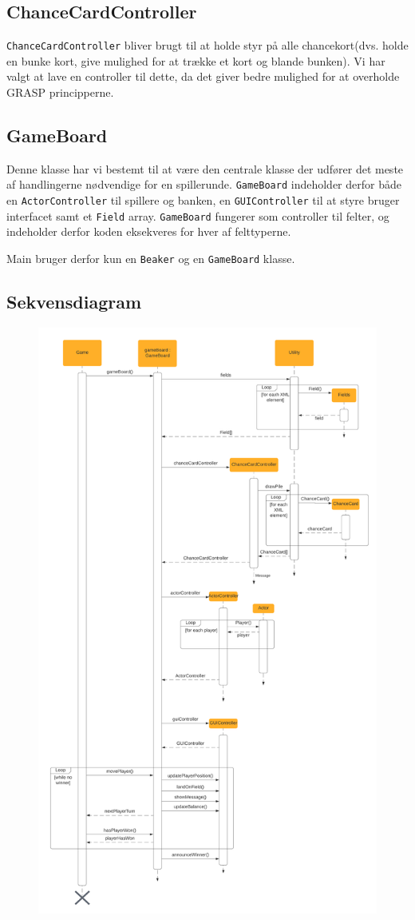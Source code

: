 \subsection{ChanceCardController}
\texttt{ChanceCardController} bliver brugt til at holde styr på alle chancekort(dvs. holde en bunke kort, give mulighed for at trække et kort og blande bunken). Vi har valgt at lave en controller til dette, da det giver bedre mulighed for at overholde GRASP principperne. 
\subsection{GameBoard}
Denne klasse har vi bestemt til at være den centrale klasse der udfører det meste af handlingerne nødvendige for en spillerunde. \texttt{GameBoard} indeholder derfor både en \texttt{ActorController} til spillere og banken, en \texttt{GUIController} til at styre bruger interfacet samt et \texttt{Field} array. \texttt{GameBoard} fungerer som controller til felter, og indeholder derfor koden eksekveres for hver af felttyperne. 

Main bruger derfor kun en \texttt{Beaker} og en \texttt{GameBoard} klasse. 
\newpage
\subsection{Sekvensdiagram}
\begin{figure}[h!]
\centering
\includegraphics[scale=0.095]{artifacts/SD.png}
\end{figure}